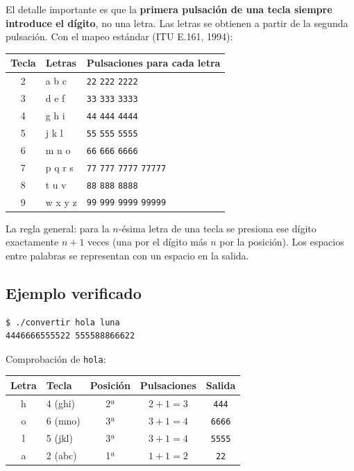 \documentclass[12pt, oneside]{article}
\begin{document}
El detalle importante es que la \textbf{primera pulsación de una tecla
siempre introduce el dígito}, no una letra.  Las letras se obtienen a
partir de la segunda pulsación.  Con el mapeo estándar (ITU E.161, 1994):

\begin{center}
\begin{tabular}{cll}
  \toprule
  \textbf{Tecla} & \textbf{Letras} & \textbf{Pulsaciones para cada letra} \\
  \midrule
  2 & a b c & \texttt{22} \quad \texttt{222} \quad \texttt{2222} \\
  3 & d e f & \texttt{33} \quad \texttt{333} \quad \texttt{3333} \\
  4 & g h i & \texttt{44} \quad \texttt{444} \quad \texttt{4444} \\
  5 & j k l & \texttt{55} \quad \texttt{555} \quad \texttt{5555} \\
  6 & m n o & \texttt{66} \quad \texttt{666} \quad \texttt{6666} \\
  7 & p q r s & \texttt{77} \quad \texttt{777} \quad \texttt{7777} \quad \texttt{77777} \\
  8 & t u v & \texttt{88} \quad \texttt{888} \quad \texttt{8888} \\
  9 & w x y z & \texttt{99} \quad \texttt{999} \quad \texttt{9999} \quad \texttt{99999} \\
  \bottomrule
\end{tabular}
\end{center}

La regla general: para la $n$-ésima letra de una tecla se presiona ese
dígito exactamente $n+1$ veces (una por el dígito más $n$ por la posición).
Los espacios entre palabras se representan con un espacio en la salida.

\subsection*{Ejemplo verificado}

\begin{verbatim}
$ ./convertir hola luna
4446666555522 555588866622
\end{verbatim}

Comprobación de \texttt{hola}:

\begin{center}
\begin{tabular}{clccc}
  \toprule
  \textbf{Letra} & \textbf{Tecla} & \textbf{Posición} & \textbf{Pulsaciones} & \textbf{Salida} \\
  \midrule
  h & 4 (ghi) & 2ª & $2+1=3$ & \texttt{444} \\
  o & 6 (mno) & 3ª & $3+1=4$ & \texttt{6666} \\
  l & 5 (jkl) & 3ª & $3+1=4$ & \texttt{5555} \\
  a & 2 (abc) & 1ª & $1+1=2$ & \texttt{22} \\
  \bottomrule
\end{tabular}
\end{center}
\end{document}
